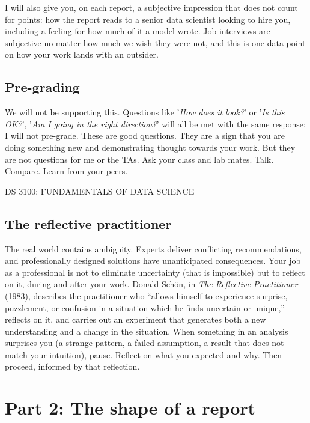 \documentclass[11pt,letterpaper]{article}
\newcommand{\coursehead}{%
  {\sffamily\fontsize{7.5}{9}\selectfont\MakeUppercase{DS 3100: FUNDAMENTALS OF DATA SCIENCE}}%
}
\begin{document}
I will also give you, on each report, a subjective impression that does not count for points: how the report reads to a senior data scientist looking to hire you, including a feeling for how much of it a model wrote. Job interviews are subjective no matter how much we wish they were not, and this is one data point on how your work lands with an outsider.

\subsection*{Pre-grading}
We will not be supporting this. Questions like '\textit{How does it look?}' or '\textit{Is this OK?}', '\textit{Am I going in the right direction?}' will all be met with the same response: I will not pre-grade. These are good questions. They are a sign that you are doing something new and demonstrating thought towards your work. But they are not questions for me or the TAs. Ask your class and lab mates. Talk. Compare. Learn from your peers.

\clearpage

\coursehead

\subsection*{The reflective practitioner}
The real world contains ambiguity. Experts deliver conflicting recommendations, and professionally designed solutions have unanticipated consequences. Your job as a professional is not to eliminate uncertainty (that is impossible) but to reflect on it, during and after your work. Donald Sch\"on, in \emph{The Reflective Practitioner} (1983), describes the practitioner who “allows himself to experience surprise, puzzlement, or confusion in a situation which he finds uncertain or unique,” reflects on it, and carries out an experiment that generates both a new understanding and a change in the situation. When something in an analysis surprises you (a strange pattern, a failed assumption, a result that does not match your intuition), pause. Reflect on what you expected and why. Then proceed, informed by that reflection.

\section{Part 2: The shape of a report}
\end{document}
